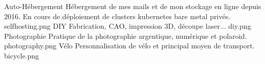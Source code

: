 \interest%
{Auto-Hébergement}%
{Hébergement de mes mails et de mon stockage en ligne depuis 2016. En cours de
déploiement de clusters kubernetes bare metal privés.}%
{selfhosting.png}%
\interest
{DIY}
{Fabrication, CAO, impression 3D, découpe laser...}
{diy.png}
\interest%
{Photographie}%
{Pratique de la photographie argentique, numérique et polaroid.}%
{photography.png}%
\interest%
{Vélo}%
{Personnalisation de vélo et principal moyen de transport.}%
{bicycle.png}%
